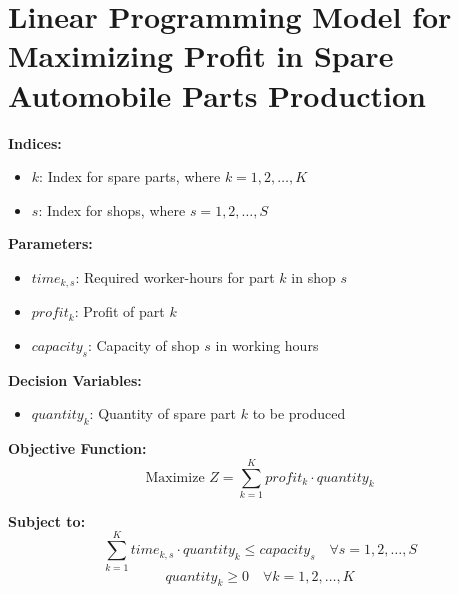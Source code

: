 \documentclass{article}
\begin{document}
\section*{Linear Programming Model for Maximizing Profit in Spare Automobile Parts Production}

\textbf{Indices:}
\begin{itemize}
    \item $k$: Index for spare parts, where $k = 1, 2, \ldots, K$
    \item $s$: Index for shops, where $s = 1, 2, \ldots, S$
\end{itemize}

\textbf{Parameters:}
\begin{itemize}
    \item $time_{k,s}$: Required worker-hours for part $k$ in shop $s$
    \item $profit_k$: Profit of part $k$
    \item $capacity_s$: Capacity of shop $s$ in working hours
\end{itemize}

\textbf{Decision Variables:}
\begin{itemize}
    \item $quantity_k$: Quantity of spare part $k$ to be produced
\end{itemize}

\textbf{Objective Function:}
\[
\text{Maximize } Z = \sum_{k=1}^{K} profit_k \cdot quantity_k
\]

\textbf{Subject to:}
\[
\sum_{k=1}^{K} time_{k,s} \cdot quantity_k \leq capacity_s \quad \forall s = 1, 2, \ldots, S
\]
\[
quantity_k \geq 0 \quad \forall k = 1, 2, \ldots, K
\]
\end{document}
